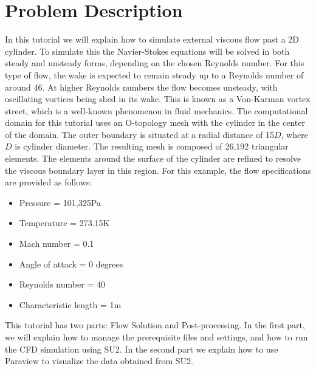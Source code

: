 \section{Problem Description}
In this tutorial we will explain how to simulate external viscous flow past a 2D cylinder. To simulate this the Navier-Stokes equations will be solved in both steady and unsteady forms, depending on the chosen Reynolds number. For this type of flow, the wake is expected to remain steady up to a Reynolds number of around 46. At higher Reynolds numbers the flow becomes unsteady, with oscillating vortices being shed in its wake. This is known as a Von-Karman vortex street, which is a well-known phenomenon in fluid mechanics. The computational domain for this tutorial uses an O-topology mesh with the cylinder in the center of the domain. The outer boundary is situated at a radial distance of 15$D$, where $D$ is cylinder diameter. The resulting mesh is composed of 26,192 triangular elements. The elements around the surface of the cylinder are refined to resolve the viscous boundary layer in this region.  For this example, the flow specifications are provided as follows:
\begin{itemize}
    \item Pressure = 101,325Pa
    \item Temperature = 273.15K
    \item Mach number = 0.1
    \item Angle of attack = 0 degrees
    \item Reynolds number = 40
    \item Characteristic length = 1m
\end{itemize}
This tutorial has two parts: Flow Solution and Post-processing. In the first part, we will explain how to manage the prerequisite files and settings, and how to run the CFD simulation using SU2. In the second part we explain how to use Paraview to visualize the data obtained from SU2.
